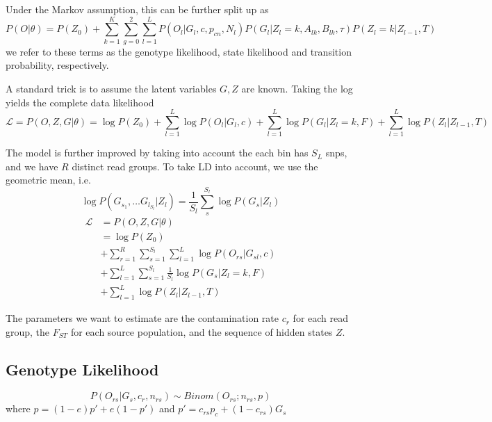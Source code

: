 \documentclass[10pt,a4paper]{article}
\begin{document}
Under the Markov assumption, this can be further split up as
$$P(O | \theta) = P(Z_0) +
\sum_{k=1}^K \sum_{g=0}^2 \sum_{l=1}^L 
P(O_l | G_l, c, p_{cn}, N_l)
P(G_l | Z_l = k, A_{lk}, B_{lk}, \tau)
P(Z_l = k |Z_{l-1}, T) $$
we refer to these terms as the genotype likelihood, state likelihood and transition probability, respectively.

A standard trick is to assume the latent variables $G, Z$ are known. Taking the log
yields the complete data likelihood
\begin{equation}
\mathcal{L}  = P(O, Z, G | \theta) = \log P(Z_0) 
+ \sum_{l=1}^L \log P(O_l | G_l, c)
+ \sum_{l=1}^L \log P(G_l | Z_l = k, F)
+ \sum_{l=1}^L  \log P(Z_l |Z_{l-1}, T) \label{eq:ll:simple}
\end{equation}

The model is further improved by taking into account the each bin has $S_L$ snps, and we have $R$ distinct read groups. To take LD into account, we use the geometric mean, i.e.
$$\log P(G_{s_1}, \dots G_{l_{S_l}}| Z_l) = \frac{1}{S_l}\sum_s^{S_l}\log P(G_{s} | Z_l)$$
\begin{align}
\mathcal{L}  &= P(O, Z, G | \theta)  \nonumber\\
&=\log P(Z_0) \nonumber\\
&+ \sum_{r=1}^R\sum_{s=1}^{S_l}\sum_{l=1}^L \log P(O_{rs} | G_{sl}, c)\nonumber\\
&+ \sum_{l=1}^L \sum_{s=1}^{S_l} \frac{1}{S_l}\log P(G_s | Z_l = k, F)\nonumber\\
&+ \sum_{l=1}^L  \log P(Z_l |Z_{l-1}, T) \label{eq:ll:correct}
\end{align}

The parameters we want to estimate are the contamination rate $c_r$ for each read group, the $F_{ST}$ for each source population, and the sequence of hidden states $Z$.

\subsection{Genotype Likelihood}
\begin{equation}
P(O_{rs}| G_s, c_r, n_{rs}) \sim Binom(O_{rs}; n_{rs}, p) \label{eq:ll:geno}
\end{equation}
where $p = (1-e) p' + e (1-p')$
and $p' =c_{rs} p_c + (1-c_{rs}) G_s$
\end{document}
